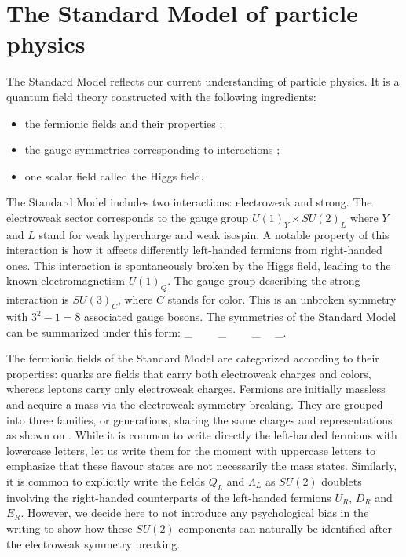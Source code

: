     \section{The Standard Model of particle physics \label{sec:standardModel}}

    The Standard Model \cite{Glashow, Weinberg} reflects our current understanding of particle physics. It is
    a quantum field theory constructed with the following ingredients:
    \begin{itemize}
        \item the fermionic fields and their properties ;
        \item the gauge symmetries corresponding to interactions ;
        \item one scalar field called the Higgs field.
    \end{itemize}

    The Standard Model includes two interactions: electroweak and strong. The electroweak
    sector corresponds to the gauge group $U(1)_Y \times SU(2)_L$ where $Y$ and $L$
    stand for weak hypercharge and weak isospin. A notable property of this interaction is
    how it affects differently left-handed fermions from right-handed ones. This interaction
    is spontaneously broken by the Higgs field, leading to the known electromagnetism
    $U(1)_Q$. The gauge group describing the strong interaction is $SU(3)_C$, where $C$
    stands for color. This is an unbroken symmetry with $3^2-1 = 8$ associated gauge bosons.
    The symmetries of the Standard Model can be summarized under this form:
    {
        _{}
        \,\,\,\,
        \times
        \,\,\,\,
        _{}
        \,\,\,\,
        \,\,\,\,
        _{}
        \,\,\,\,
        \times
        _{}.
    }

    The fermionic fields of the Standard Model are categorized according to their
    properties: quarks are fields that carry both electroweak charges and colors, whereas
    leptons carry only electroweak charges. Fermions are initially massless and acquire a
    mass via the electroweak symmetry breaking. They are grouped into three families, or
    generations, sharing the same charges and representations as shown on .
    While it is common to write directly the left-handed fermions with lowercase letters,
    let us write them for the moment with uppercase letters to emphasize that these flavour
    states are not necessarily the mass states. Similarly, it is common to explicitly
    write the fields $Q_L$ and $\Lambda_L$ as $SU(2)$ doublets involving the right-handed
    counterparts of the left-handed fermions $U_R$, $D_R$ and $E_R$. However, we decide here
    to not introduce any psychological bias in the writing to show how these $SU(2)$
    components can naturally be identified after the electroweak symmetry breaking.

